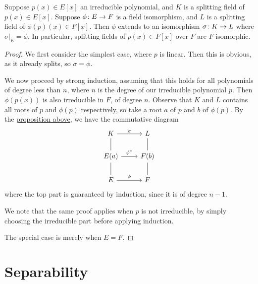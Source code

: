 \begin{theorem}\label{thm:uniqueness-splitting-field}
    Suppose \(p(x) \in E[x]\) an irreducible polynomial,
    and \(K\) is a splitting field of \(p(x) \in E[x]\).
    Suppose \(\phi\colon E\to F\) is a field isomorphism,
    and \(L\) is a splitting field of \(\phi(p)(x) \in F[x]\).
    Then \(\phi\) extends to an isomorphism \(\sigma\colon K\to L\)
    where \(\sigma\vert_E = \phi\).
    In particular, splitting fields of \(p(x) \in F[x]\) over \(F\)
    are \(F\)-isomorphic.
\end{theorem}
\begin{proof}
    We first consider the simplest case, where \(p\) is linear.
    Then this is obvious, as it already splits, so \(\sigma = \phi\).

    We now proceed by strong induction, assuming that this holds for all polynomials of degree less than \(n\),
    where \(n\) is the degree of our irreducible polynomial \(p\).
    Then \(\phi(p(x))\) is also irreducible in \(F\), of degree \(n\).
    Observe that \(K\) and \(L\) contains all roots of \(p\) and \(\phi(p)\) respectively,
    so take a root \(a\) of \(p\) and \(b\) of \(\phi(p)\).
    By the \hyperref[prop:bijection-extension-roots]{proposition above},
    we have the commutative diagram
    \begin{equation*}
        \begin{tikzcd}
            K \arrow{r}{\sigma} & L \\
            E(a) \arrow{r}{\phi^\ast} \arrow[dash]{u} & F(b) \arrow[dash]{u} \\
            E \arrow[dash]{u} \arrow{r}{\phi} & F \arrow[dash]{u}
        \end{tikzcd}
    \end{equation*}
    where the top part is guaranteed by induction, since it is of degree \(n-1\).

    We note that the same proof applies when \(p\) is not irreducible,
    by simply choosing the irreducible part before applying induction.

    The special case is merely when \(E = F\).
\end{proof}


\section{Separability}

